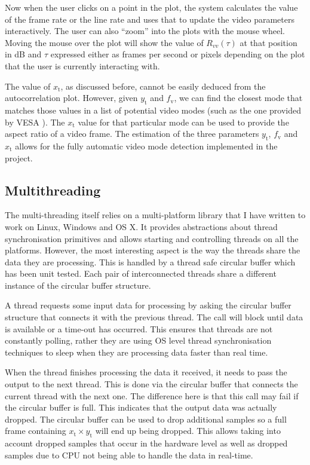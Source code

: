 \documentclass[a4paper,12pt,twoside,openright]{report}
\begin{document}
Now when the user clicks on a point in the plot, the system calculates the value of the frame rate or the line rate and uses that to update the video parameters interactively. The user can also ``zoom'' into the plots with the mouse wheel. Moving the mouse over the plot will show the value of $R_{vv}(\tau)$ at that position in dB and $\tau$ expressed either as frames per second or pixels depending on the plot that the user is currently interacting with. 

The value of $x_\text{t}$, as discussed before, cannot be easily deduced from the autocorrelation plot. However, given $y_\text{t}$ and $f_\text{v}$, we can find the closest mode that matches those values in a list of potential video modes (such as the one provided by VESA \cite{vesa}). The $x_\text{t}$ value for that particular mode can be used to provide the aspect ratio of a video frame. The estimation of the three parameters $y_\text{t}$, $f_\text{v}$ and $x_\text{t}$ allows for the fully automatic video mode detection implemented in the project.

\subsection{Multithreading}

The multi-threading itself relies on a multi-platform library that I have written to work on Linux, Windows and OS X. It provides abstractions about thread synchronisation primitives and allows starting and controlling threads on all the platforms. However, the most interesting aspect is the way the threads share the data they are processing. This is handled by a thread safe circular buffer which has been unit tested. Each pair of interconnected threads share a different instance of the circular buffer structure.

A thread requests some input data for processing by asking the circular buffer structure that connects it with the previous thread. The call will block until data is available or a time-out has occurred. This ensures that threads are not constantly polling, rather they are using OS level thread synchronisation techniques to sleep when they are processing data faster than real time.

When the thread finishes processing the data it received, it needs to pass the output to the next thread. This is done via the circular buffer that connects the current thread with the next one. The difference here is that this call may fail if the circular buffer is full. This indicates that the output data was actually dropped. The circular buffer can be used to drop additional samples so a full frame containing $x_\text{t} \times y_\text{t}$ will end up being dropped. This allows taking into account dropped samples that occur in the hardware level as well as dropped samples due to CPU not being able to handle the data in real-time.
\end{document}
